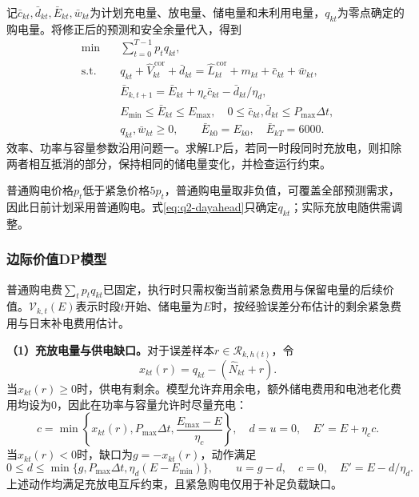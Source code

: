 记$\bar c_{kt},\bar d_{kt},\bar E_{kt},\bar w_{kt}$为计划充电量、放电量、储电量和未利用电量，$q_{kt}$为零点确定的购电量。将修正后的预测和安全余量代入，得到
\begin{equation}
\begin{aligned}
    \min\quad &\sum_{t=0}^{T-1}p_tq_{kt},\\
    \text{s.t.}\quad
    &q_{kt}+\widehat V_{kt}^{\,\mathrm{cor}}+\bar d_{kt}
      =\widehat L_{kt}^{\,\mathrm{cor}}+m_{kt}+\bar c_{kt}+\bar w_{kt},\\
    &\bar E_{k,t+1}=\bar E_{kt}+\eta_c\bar c_{kt}-\bar d_{kt}/\eta_d,\\
    &E_{\min}\leq\bar E_{kt}\leq E_{\max},\quad
      0\leq\bar c_{kt},\bar d_{kt}\leq P_{\max}\Delta t,\\
    &q_{kt},\bar w_{kt}\geq0,\qquad
      \bar E_{k0}=E_{k0},\quad\bar E_{kT}=6000.
\end{aligned}
\label{eq:q2-dayahead}
\end{equation}
效率、功率与容量参数沿用问题一。求解LP后，若同一时段同时充放电，则扣除两者相互抵消的部分，保持相同的储电量变化，并检查运行约束。

普通购电价格$p_t$低于紧急价格$5p_t$，普通购电量取非负值，可覆盖全部预测需求，因此日前计划采用普通购电。式\eqref{eq:q2-dayahead}只确定$q_{kt}$；实际充放电随供需调整。

\subsubsection{边际价值DP模型}

普通购电费$\sum_t p_tq_{kt}$已固定，执行时只需权衡当前紧急费用与保留电量的后续价值。$\mathcal V_{k,t}(E)$表示时段$t$开始、储电量为$E$时，按经验误差分布估计的剩余紧急费用与日末补电费用估计。

\textbf{（1）充放电量与供电缺口。}对于误差样本$r\in\mathcal R_{k,h(t)}$，令
\begin{equation}
    x_{kt}(r)=q_{kt}-(\widehat N_{kt}+r).
    \label{eq:q2-balance-sample}
\end{equation}
当$x_{kt}(r)\geq0$时，供电有剩余。模型允许弃用余电，额外储电费用和电池老化费用均设为0，因此在功率与容量允许时尽量充电：
\begin{equation}
    c=\min\left\{x_{kt}(r),P_{\max}\Delta t,
       \frac{E_{\max}-E}{\eta_c}\right\},\quad
    d=u=0,\quad E'=E+\eta_c c.
    \label{eq:q2-charge}
\end{equation}
当$x_{kt}(r)<0$时，缺口为$g=-x_{kt}(r)$，动作满足
\begin{equation}
    0\leq d\leq\min\{g,P_{\max}\Delta t,\eta_d(E-E_{\min})\},
    \qquad u=g-d,\quad c=0,\quad E'=E-d/\eta_d.
    \label{eq:q2-discharge}
\end{equation}
上述动作均满足充放电互斥约束，且紧急购电仅用于补足负载缺口。

